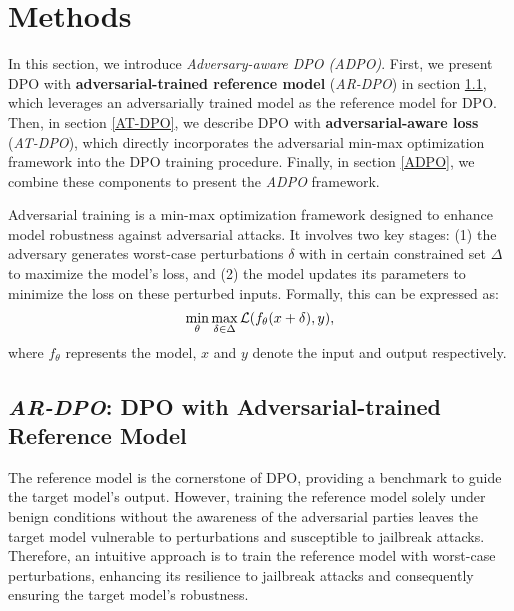\vspace{-0.5em}
\section{Methods}
\vspace{-0.5em}
In this section, we introduce \textit{Adversary-aware DPO (ADPO)}. First, we present DPO with \textbf{adversarial-trained reference model} (\textit{AR-DPO}) in section \ref{AR-DPO}, which leverages an adversarially trained model as the reference model for DPO. Then, in section \ref{AT-DPO}, we describe DPO with \textbf{adversarial-aware loss} (\textit{AT-DPO}), which directly incorporates the adversarial min-max optimization framework into the DPO training procedure. Finally, in section \ref{ADPO}, we combine these components to present the \textit{ADPO} framework.

 Adversarial training is a min-max optimization framework designed to enhance model robustness against adversarial attacks. It involves two key stages: (1) the adversary generates worst-case perturbations $\delta$
with in certain constrained set $\Delta$ to maximize the model's loss, and (2) the model updates its parameters to minimize the loss on these perturbed inputs. Formally, this can be expressed as:
\begin{equation}
\fontsize{10}{12}
    \min_\theta \max_{\delta \in \Delta} \mathcal{L}(f_\theta(x + \delta), y),
    \vspace{-0.5em}
\end{equation}
where $f_{\theta}$ represents the model, $x$ and $y$ denote the input and output respectively.

\vspace{-0.5em}
\subsection{\textit{AR-DPO}: DPO with Adversarial-trained Reference Model}\label{AR-DPO}
\vspace{-0.5em}

The reference model is the cornerstone of DPO, providing a benchmark to guide the target model's output. However, training the reference model solely under benign conditions without the awareness of the adversarial parties leaves the target model vulnerable to perturbations and susceptible to jailbreak attacks. Therefore, an intuitive approach is to train the reference model with worst-case perturbations, enhancing its resilience to jailbreak attacks and consequently ensuring the target model's robustness.

